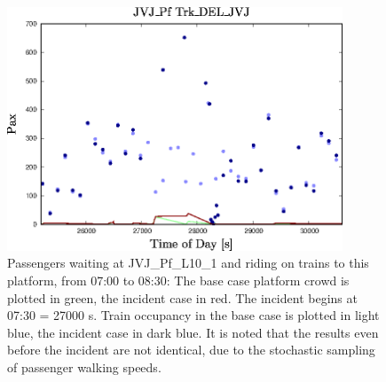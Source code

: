\begin{figure}[!ht]
  \centering
  \includegraphics[angle=0,width=10cm]{90_figs/_Occupancy_JVJ_Pf_L10_1_and_Trk_to_JVJ_incident.eps}
\caption{Passengers waiting at JVJ\_Pf\_L10\_1 and riding on trains to this platform, from 07:00 to 08:30:
  The base case platform crowd is plotted in green, the incident case
  in red. The incident begins at 07:30 = 27000 s.  Train occupancy in
  the base case is plotted in light blue, the incident case in dark
  blue.  It is noted that the results even before the incident are not
  identical, due to the stochastic sampling of passenger walking
  speeds.  }
\label{PlatOccupInc}
\end{figure}

